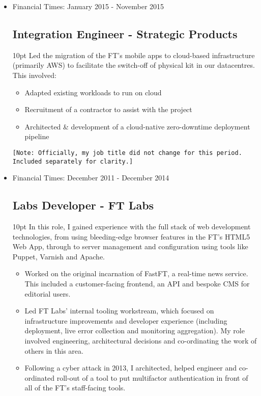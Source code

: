 \documentclass[a4paper]{article}
\newenvironment{detail}{\begin{adjustwidth}{10pt}{}}{\end{adjustwidth}}
\begin{document}
\begin{itemize}
\item Financial Times: January 2015 - November 2015
\subsection*{Integration Engineer - Strategic Products}
\begin{detail}
Led the migration of the FT's mobile apps to cloud-based infrastructure (primarily AWS) to facilitate the switch-off of physical kit in our datacentres.  This involved:
\begin{itemize}
	\item Adapted existing workloads to run on cloud
	\item Recruitment of a contractor to assist with the project
	\item Architected \& development of a cloud-native zero-downtime deployment pipeline
\end{itemize}
\end{detail}

\small{\texttt{[Note: Officially, my job title did not change for this period. Included separately for clarity.]}}


\pagebreak

\item Financial Times: December 2011 - December 2014
\subsection*{Labs Developer - FT Labs}
\begin{detail}
In this role, I gained experience with the full stack of web development technologies, from using bleeding-edge browser features in the FT's HTML5 Web App, through to server management and configuration using tools like Puppet, Varnish and Apache.
\begin{itemize}
	\item Worked on the original incarnation of FastFT, a real-time news service.  This included a customer-facing frontend, an API and bespoke CMS for editorial users.
	\item Led FT Labs' internal tooling workstream, which focused on infrastructure improvements and developer experience (including deployment, live error collection and monitoring aggregation).  My role involved engineering, architectural decisions and co-ordinating the work of others in this area.
	\item Following a cyber attack in 2013, I architected, helped engineer and co-ordinated roll-out of a tool to put multifactor authentication in front of all of the FT's staff-facing tools.
\end{itemize}
\end{detail}



\end{itemize}
\end{document}
